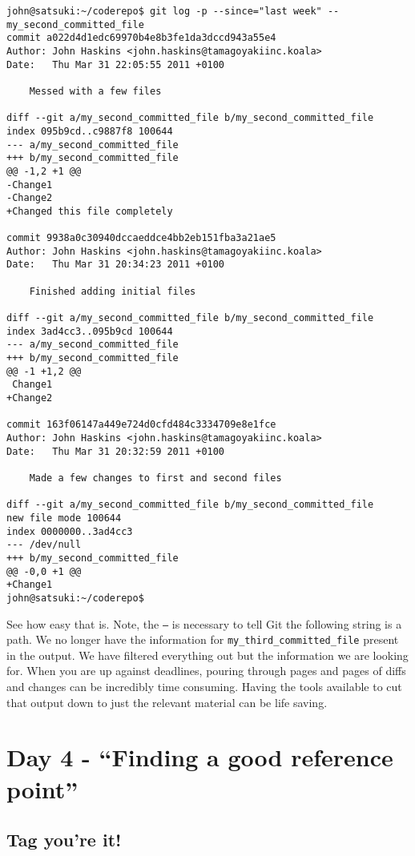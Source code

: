 \begin{Verbatim}[frame=leftline,framerule=1mm,fontsize=\relsize{-3}] 
john@satsuki:~/coderepo$ git log -p --since="last week" -- 
my_second_committed_file
commit a022d4d1edc69970b4e8b3fe1da3dccd943a55e4
Author: John Haskins <john.haskins@tamagoyakiinc.koala>
Date:   Thu Mar 31 22:05:55 2011 +0100

    Messed with a few files

diff --git a/my_second_committed_file b/my_second_committed_file
index 095b9cd..c9887f8 100644
--- a/my_second_committed_file
+++ b/my_second_committed_file
@@ -1,2 +1 @@
-Change1
-Change2
+Changed this file completely

commit 9938a0c30940dccaeddce4bb2eb151fba3a21ae5
Author: John Haskins <john.haskins@tamagoyakiinc.koala>
Date:   Thu Mar 31 20:34:23 2011 +0100

    Finished adding initial files

diff --git a/my_second_committed_file b/my_second_committed_file
index 3ad4cc3..095b9cd 100644
--- a/my_second_committed_file
+++ b/my_second_committed_file
@@ -1 +1,2 @@
 Change1
+Change2

commit 163f06147a449e724d0cfd484c3334709e8e1fce
Author: John Haskins <john.haskins@tamagoyakiinc.koala>
Date:   Thu Mar 31 20:32:59 2011 +0100

    Made a few changes to first and second files

diff --git a/my_second_committed_file b/my_second_committed_file
new file mode 100644
index 0000000..3ad4cc3
--- /dev/null
+++ b/my_second_committed_file
@@ -0,0 +1 @@
+Change1
john@satsuki:~/coderepo$ 
\end{Verbatim}

See how easy that is.  Note, the \texttt{--} is necessary to tell Git the following string is a path.  We no longer have the information for \texttt{my\_third\_committed\_file} present in the output.  We have filtered everything out but the information we are looking for.  When you are up against deadlines, pouring through pages and pages of diffs and changes can be incredibly time consuming.  Having the tools available to cut that output down to just the relevant material can be life saving.

\section{Day 4 - ``Finding a good reference point''}
\subsection{Tag you're it!}

